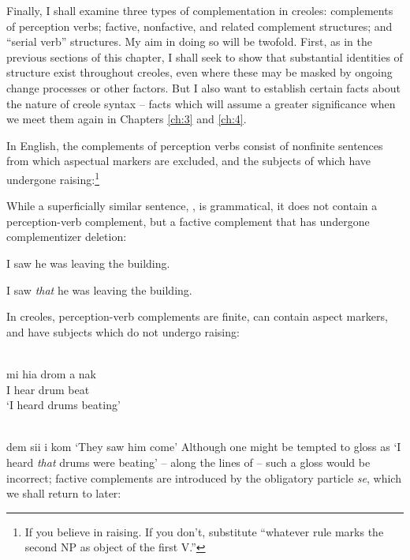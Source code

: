 Finally, I shall examine three types of complementation in creoles: complements of perception verbs; factive, nonfactive, and related complement structures; and ``serial verb'' structures. My aim in doing so will be twofold. First, as in the previous sections of this chapter, I shall seek to show that substantial identities of structure exist throughout creoles, even where these may be masked by ongoing change processes or other factors. But I also want to establish certain facts about the nature of creole syntax -- facts which will assume a greater significance when we meet them again in Chapters \ref{ch:3} and \ref{ch:4}.

In English, the complements of perception verbs consist of nonfinite sentences from which aspectual markers are excluded, and the subjects of which have undergone raising:\footnote{If you believe in raising. If you don't, substitute ``whatever rule marks the second NP as object of the first V.''}

\z

\z

\z

\z

\z
While a superficially similar sentence, , is grammatical, it does not contain a perception-verb complement, but a factive complement that has undergone complementizer deletion:

\ea\label{ex:2:130}I saw he was leaving the building.\z

\ea\label{ex:2:131}I saw \textit{that} he was leaving the building.\z

In creoles, perception-verb complements are finite, can contain aspect markers, and have subjects which do not undergo raising:

\ea\label{ex:2:132}
\ili{\langGC}{}{}\\
\gll mi hia drom a nak\\
I hear drum {\ASP} beat\\
\glt `I heard drums beating'
\z

\ea\label{ex:2:133}
\ili{\langGC}{}{}\\
dem sii i kom
\glt `They saw him come'
\z
Although one might be tempted to gloss  as `I heard \textit{that} drums were beating' -- along the lines of  -- such a gloss would be incorrect; factive complements are introduced by the obligatory particle \textit{se}, which we shall return to later:

